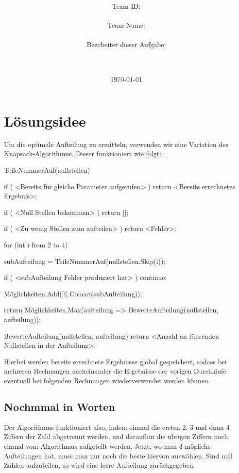 \documentclass[a4paper,10pt,ngerman]{scrartcl}
\title{\textbf{\Huge\Aufgabe}}
\author{\LARGE Team-ID: \LARGE \TeamID \\\\
	    \LARGE Team-Name: \LARGE \TeamName \\\\
	    \LARGE Bearbeiter dieser Aufgabe: \\ 
	    \LARGE \Namen\\\\}
\date{\LARGE\today}
\begin{document}
\maketitle
\tableofcontents

\section{Lösungsidee} \label{idea}

Um die optimale Aufteilung zu ermitteln,
verwenden wir eine Variation des Knapsack-Algorithmus.
Dieser funktioniert wie folgt:

\begin{lstcs}
TeileNummerAuf(nullstellen) {
    if ( <Bereits für gleiche Parameter aufgerufen> ) {
        return <Bereits errechnetes Ergebnis>;
    }
    
    if ( <Null Stellen bekommen> ) {
      return [];
    }

    if ( <Zu wenig Stellen zum aufteilen> ) {
    	return <Fehler>;
    }

    for (int i from 2 to 4) {
        subAufteilung = TeileNummerAuf(nullstellen.Skip(i));

		    if ( <subAufteilung Fehler produziert hat> ) continue;
		
        Möglichkeiten.Add([i].Concat(subAufteilung));
    }

    return Möglichkeiten.Max(aufteilung => BewerteAufteilung(nullstellen, aufteilung));
}

BewerteAufteilung(nullstellen, aufteilung) {
    return <Anzahl an führenden Nullstellen in der Aufteilung>;
}
\end{lstcs}

Hierbei werden bereits errechnete Ergebnisse global gespeichert,
sodass bei mehreren Rechnungen nacheinander die Ergebnisse der vorigen
Durchläufe eventuell bei folgenden Rechnungen wiederverwendet werden können.

\subsection{Nochmmal in Worten}

Der Algorithmus funktioniert also, indem einmal die ersten 2, 3 und dann 4
Ziffern der Zahl abgetrennt werden, und daraufhin die übrigen Ziffern
noch einmal vom Algorithmus aufgeteilt werden.
Jetzt, wo man 3 mögliche Aufteilungen hat, muss man nur noch die beste
hiervon auswählen.
Sind null Zahlen aufzuteilen, so wird eine leere Aufteilung zurückgegeben.
\end{document}
